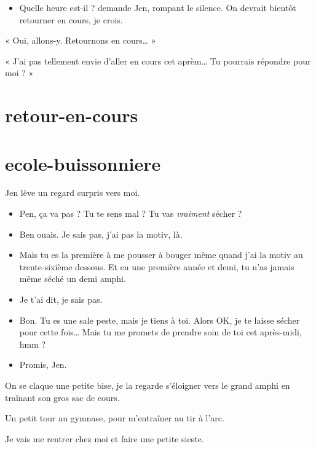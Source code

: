 \begin{itemize}
\item Quelle heure est-il ? demande Jen, rompant le silence. On devrait bientôt retourner en cours, je crois.
\end{itemize}

\item « Oui, allons-y. Retournons en cours… » 
\item « J'ai pas tellement envie d'aller en cours cet aprèm… Tu pourrais répondre pour moi ? » 
\enw

\section{retour-en-cours}



\section{ecole-buissonniere}

Jen lève un regard surpris vers moi.

\begin{itemize}
\item Pen, ça va pas ? Tu te sens mal ? Tu vas \textit{vraiment} sécher ?
\item Ben ouais. Je sais pas, j'ai pas la motiv, là.
\item Mais tu es la première à me pousser à bouger même quand j'ai la motiv au trente-sixième dessous. Et en une première année et demi, tu n'as jamais même séché un demi amphi.
\item Je t'ai dit, je sais pas.
\item Bon. Tu es une sale peste, mais je tiens à toi. Alors OK, je te laisse sécher pour cette fois… Mais tu me promets de prendre soin de toi cet après-midi, hmm ?
\item Promis, Jen.
\end{itemize}

On se claque une petite bise, je la regarde s'éloigner vers le grand amphi en traînant son gros sac de cours.

\item Un petit tour au gymnase, pour m'entraîner au tir à l'arc. 
\item Je vais me rentrer chez moi et faire une petite sieste. 
\enw

